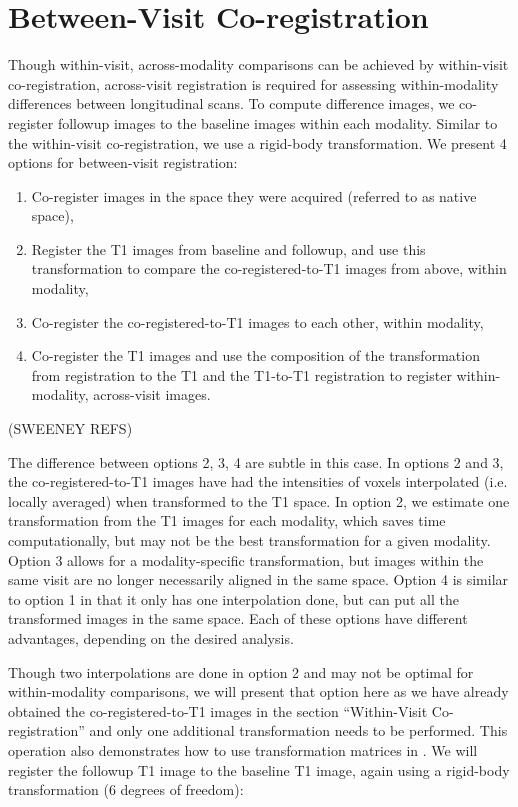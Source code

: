 \section{Between-Visit Co-registration}
Though within-visit, across-modality comparisons can be achieved by within-visit co-registration, across-visit registration is required for assessing within-modality differences between longitudinal scans.   To compute difference images, we co-register followup images to the baseline images within each modality.  Similar to the within-visit co-registration, we use a rigid-body transformation.  We present 4 options for between-visit registration:
\begin{enumerate}
\item Co-register images in the space they were acquired (referred to as native space),
\item Register the T1 images from baseline and followup, and use this transformation to compare the co-registered-to-T1 images from above, within modality, 
\item Co-register the co-registered-to-T1 images to each other, within modality,
\item Co-register the T1 images and use the composition of the transformation from registration to the T1 and the T1-to-T1 registration to register within-modality, across-visit images.
\end{enumerate}
(SWEENEY REFS)

The difference between options 2, 3, 4 are subtle in this case.  In options 2 and 3, the co-registered-to-T1 images have had the intensities of voxels interpolated (i.e. locally averaged) when transformed to the T1 space.  In option 2, we estimate one transformation from the T1 images for each modality, which saves time computationally, but may not be the best transformation for a given modality.  Option 3 allows for a modality-specific transformation, but images within the same visit are no longer necessarily aligned in the same space.  Option 4 is similar to option 1 in that it only has one interpolation done, but can put all the transformed images in the same space.  Each of these options have different advantages, depending on the desired analysis.  

Though two interpolations are done in option 2 and may not be optimal for within-modality comparisons, we will present that option here as we have already obtained the co-registered-to-T1 images in the section ``Within-Visit Co-registration'' and only one additional transformation needs to be performed.  This operation also demonstrates how to use transformation matrices in .  We will register the followup T1 image to the baseline T1 image, again using a rigid-body transformation (6 degrees of freedom):

